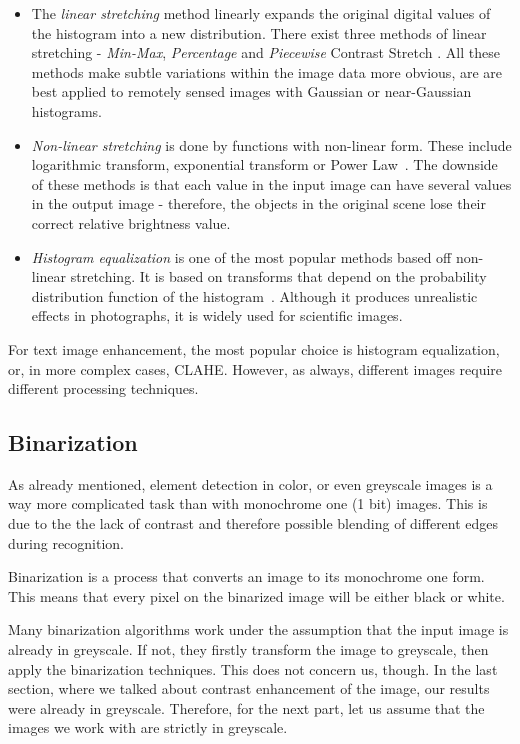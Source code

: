 \begin{itemize}

\item The \emph{linear stretching} method linearly expands the original digital values of the histogram into a new distribution. There exist three methods of linear stretching - \emph{Min-Max}, \emph{Percentage} and \emph{Piecewise} Contrast Stretch \citet{linearNonStretch}. All these methods make subtle variations within the image data more obvious, are are best applied to remotely sensed images with Gaussian or near-Gaussian histograms.

\item\emph{Non-linear stretching} is done by functions with non-linear form. These include logarithmic transform, exponential transform or Power Law~\citep{linearNonStretch}. The downside of these methods is that each value in the input image can have several values in the output image - therefore, the objects in the original scene lose their correct relative brightness value.

\item\emph{Histogram equalization} is one of the most popular methods based off non-linear stretching. It is based on transforms that depend on the probability distribution function of the histogram~\citep{histogramEQ}. Although it produces unrealistic effects in photographs, it is widely used for scientific images.

\end{itemize}

For text image enhancement, the most popular choice is histogram equalization, or, in more complex cases, CLAHE. However, as always, different images require different processing techniques.

\subsection{Binarization}

As already mentioned, element detection in color, or even greyscale images is a way more complicated task than with monochrome one (1 bit) images. This is due to the the lack of contrast and therefore possible blending of different edges during recognition.

Binarization is a process that converts an image to its monochrome one form. This means that every pixel on the binarized image will be either black or white.

Many binarization algorithms work under the assumption that the input image is already in greyscale. If not, they firstly transform the image to greyscale, then apply the binarization techniques. This does not concern us, though. In the last section, where we talked about contrast enhancement of the image, our results were already in greyscale. Therefore, for the next part, let us assume that the images we work with are strictly in greyscale.

